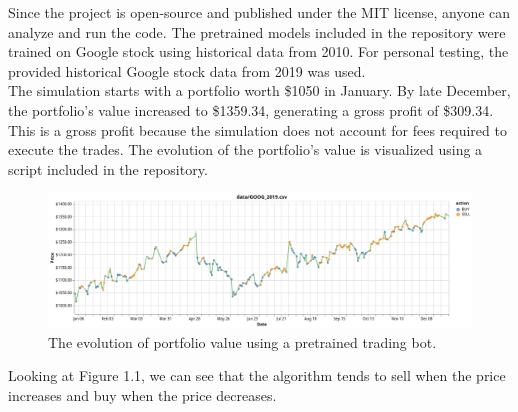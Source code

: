 \documentclass[a4paper,oneside,onecolumn,12pt]{LegrandOrangeBook}
\begin{document}
			Since the project is open-source and published under the MIT license, anyone can analyze and run the code. The pretrained models included in the repository were trained on Google stock using historical data from 2010. For personal testing, the provided historical Google stock data from 2019 was used.\\
			The simulation starts with a portfolio worth \$1050 in January. By late December, the portfolio's value increased to \$1359.34, generating a gross profit of \$309.34. This is a gross profit because the simulation does not account for fees required to execute the trades. The evolution of the portfolio's value is visualized using a script included in the repository.\\
			\begin{figure}[H]
			\begin{center}
				\includegraphics[width=\linewidth]{kep/trade_bot_visualization.png}
				\caption{The evolution of portfolio value using a pretrained trading bot.}
			\end{center}
			\end{figure}
			Looking at Figure 1.1, we can see that the algorithm tends to sell when the price increases and buy when the price decreases.\\
\end{document}
